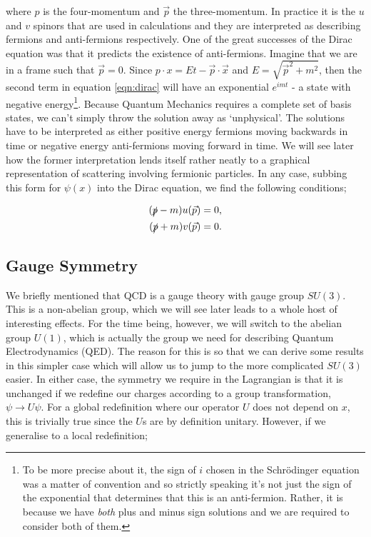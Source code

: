 where $p$ is the four-momentum and $\vec{p}$ the three-momentum. In practice it is the $u$ and $v$ spinors that are used in calculations and they are interpreted as describing fermions and anti-fermions respectively. One of the great successes of the Dirac equation was that it predicts the existence of anti-fermions. Imagine that we are in a frame such that $\vec{p} = 0$. Since $p \cdot x = Et - \vec{p}\cdot \vec{x}$ and $E = \sqrt{\vec{p}^2 + m^2}$, then the second term in equation \ref{eqn:dirac} will have an exponential $e^{i m t}$ - a state with negative energy\footnote{To be more precise about it, the sign of $i$ chosen in the Schr\"odinger equation was a matter of convention and so strictly speaking it's not just the sign of the exponential that determines that this is an anti-fermion. Rather, it is because we have \emph{both} plus and minus sign solutions and we are required to consider both of them.}. Because Quantum Mechanics requires a complete set of basis states, we can't simply throw the solution away as `unphysical'. The solutions have to be interpreted as either positive energy fermions moving backwards in time or negative energy anti-fermions moving forward in time. We will see later how the former interpretation lends itself rather neatly to a graphical representation of scattering involving fermionic particles. In any case, subbing this form for $\psi(x)$ into the Dirac equation, we find the following conditions;

\begin{subequations}
\begin{align}
(\slashed{p} - m)u(\vec{p}) &= 0, \\
(\slashed{p} + m)v(\vec{p}) &= 0.
\end{align}
\end{subequations}


\subsection{Gauge Symmetry}

We briefly mentioned that QCD is a gauge theory with gauge group $SU(3)$. This is a non-abelian group, which we will see later leads to a whole host of interesting effects. For the time being, however, we will switch to the abelian group $U(1)$, which is actually the group we need for describing Quantum Electrodynamics (QED). The reason for this is so that we can derive some results in this simpler case which will allow us to jump to the more complicated $SU(3)$ easier. In either case, the symmetry we require in the Lagrangian is that it is unchanged if we redefine our charges according to a group transformation, $\psi \to U \psi$. For a global redefinition where our operator $U$ does not depend on $x$, this is trivially true since the $U$s are by definition unitary. However, if we generalise to a local redefinition;

